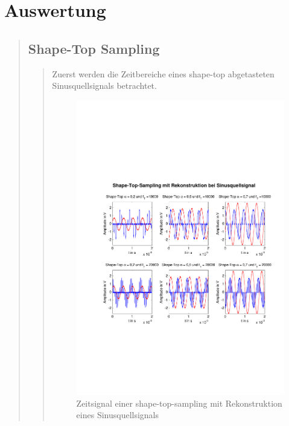 
    
    \section{Auswertung}
    \begin{quote}
    
        \subsection{Shape-Top Sampling}
        \begin{quote}    
        	Zuerst werden die Zeitbereiche eines shape-top abgetasteten
        	Sinusquellsignals betrachtet.
            
        	\begin{figure}[H]
            \centering
                \includegraphics[scale=0.6, trim = 1.5cm 6cm 1cm 8cm,
                clip]{./Bilder/shape-top-sinus}
                    \caption{Zeitsignal einer shape-top-sampling mit Rekonstruktion
                    eines Sinusquellsignals}
          	\end{figure}
      	    

\end{quote}
\end{quote}
